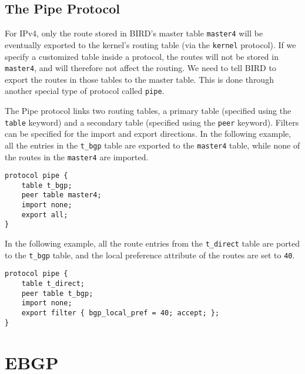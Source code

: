 \begin{lstlisting}

\end{lstlisting}
 


\subsection{The Pipe Protocol} 

For IPv4, only the route stored in BIRD's master table \texttt{master4} will be eventually
exported to the kernel's routing table (via the \texttt{kernel} protocol). 
If we specify a customized table
inside a protocol, the routes will not be stored in \texttt{master4},
and will therefore not affect the routing. We need to tell BIRD
to export the routes in those tables to the master table. This is done 
through another special type of protocol called \texttt{pipe}. 

The Pipe protocol links two routing tables, a primary table (specified using
the \texttt{table} keyword) and a secondary table (specified using 
the \texttt{peer} keyword). Filters can be specified for the import
and export directions. In the following example, all the entries
in the \texttt{t\_bgp} table are exported to the \texttt{master4} table,
while none of the routes in the \texttt{master4} are imported. 

\begin{lstlisting}
protocol pipe {
    table t_bgp;
    peer table master4;
    import none;
    export all;
}
\end{lstlisting}

In the following example, all the route entries from the \texttt{t\_direct}
table are ported to the \texttt{t\_bgp} table, and the local preference
attribute of the routes are set to \texttt{40}.

\begin{lstlisting}
protocol pipe {
    table t_direct;
    peer table t_bgp;
    import none;
    export filter { bgp_local_pref = 40; accept; };
}
\end{lstlisting}
 


\section{EBGP} 


